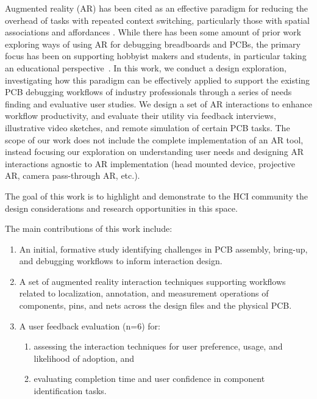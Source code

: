 \documentclass [11pt, proquest] {uwthesis}[2020/02/24]
\begin{document}


Augmented reality (AR) has been cited as an effective paradigm for reducing the overhead of tasks with repeated context switching, particularly those with spatial associations and affordances \cite{Azuma1997AReality, Feiner1993Knowledge-basedReality, Caudell1992AugmentedProcesses, Tang2003ComparativeAssembly, Muensterer2014GoogleStudy}.
While there has been some amount of prior work exploring ways of using AR for debugging breadboards and PCBs, the primary focus has been on supporting hobbyist makers and students, in particular taking an educational perspective~\cite{Drew2016TheToastboard,Wu2017CurrentViz, Strasnick2017Scanalog:Hardware, Kim2019VirtualComponent}.
In this work, we conduct a design exploration, investigating how this paradigm can be effectively applied to support the existing PCB debugging workflows of industry professionals through a series of needs finding and evaluative user studies. 
We design a set of AR interactions to enhance workflow productivity, and evaluate their utility via feedback interviews, illustrative video sketches, and remote simulation of certain PCB tasks. The scope of our work does not include the complete implementation of an AR tool, instead focusing our exploration on understanding user needs and designing AR interactions agnostic to AR implementation (head mounted device, projective AR, camera pass-through AR, etc.).

The goal of this work is to highlight and demonstrate to the HCI community the design considerations and research opportunities in this space.

The main contributions of this work include:

\begin{enumerate}
    \item An initial, formative study identifying challenges in PCB assembly, bring-up, and debugging workflows to inform interaction design.
    \item A set of augmented reality interaction techniques supporting workflows related to localization, annotation, and measurement operations of components, pins, and nets across the design files and the physical PCB.
    \item A user feedback evaluation (n=6) for:
    \begin{enumerate}
        \item assessing the interaction techniques for user preference, usage, and likelihood of adoption, and
        \item evaluating completion time and user confidence in component identification tasks.
    \end{enumerate}
\end{enumerate}
\end{document}
